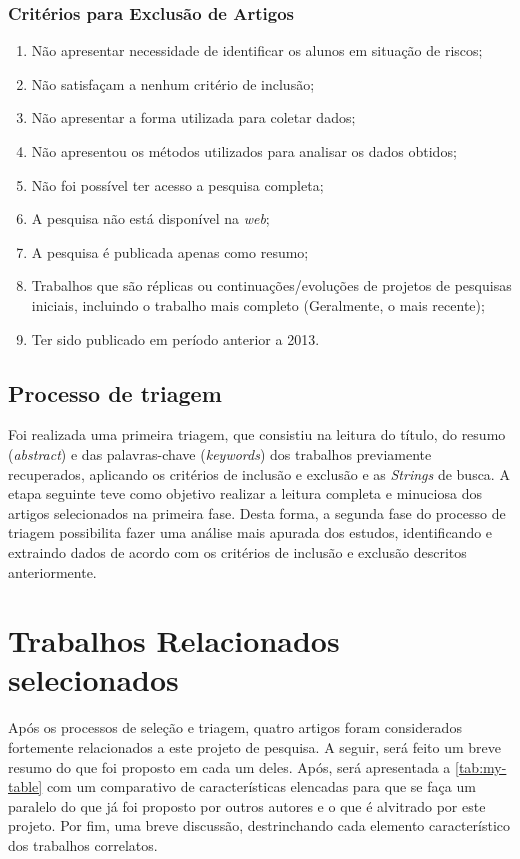 \documentclass[
	12pt,				%
	openright,			%
	oneside,
	a4paper,			%
	english,			%
	french,				%
	spanish,			%
	brazil,				%
	]{abntex2}
\begin{document}
\subsubsection{Critérios para Exclusão de Artigos}
\begin{enumerate}
    \item Não apresentar necessidade de identificar os alunos em situação de riscos;
    \item Não satisfaçam a nenhum critério de inclusão;
    \item Não apresentar a forma utilizada para coletar dados;
    \item Não apresentou os métodos utilizados para analisar os dados obtidos;
    \item Não foi possível ter acesso a pesquisa completa;
    \item A pesquisa não está disponível na \textit{web};
    \item A pesquisa é publicada apenas como resumo;
    \item Trabalhos que são réplicas ou continuações/evoluções de projetos de pesquisas iniciais, incluindo o trabalho mais completo (Geralmente, o mais recente);
    \item Ter sido publicado em período anterior a 2013.
\end{enumerate}

\subsection{Processo de triagem}
Foi realizada uma primeira triagem, que consistiu na leitura do título, do resumo (\textit{abstract}) e das palavras-chave (\textit{keywords}) dos trabalhos previamente recuperados, aplicando os critérios de inclusão e exclusão e as \textit{Strings} de busca.
A etapa seguinte teve como objetivo realizar a leitura completa e minuciosa dos artigos selecionados na primeira fase. Desta forma, a segunda fase do processo de triagem possibilita fazer uma análise mais apurada dos estudos, identificando e extraindo dados de acordo com os critérios de inclusão e exclusão descritos anteriormente.

\section{Trabalhos Relacionados selecionados}
Após os processos de seleção e triagem, quatro artigos foram considerados fortemente relacionados a este projeto de pesquisa. A seguir, será feito um breve resumo do que foi proposto em cada um deles. Após, será apresentada a \autoref{tab:my-table} com um comparativo de características elencadas para que se faça um paralelo do que já foi proposto por outros autores e o que é alvitrado por este projeto. Por fim, uma breve discussão, destrinchando cada elemento característico dos trabalhos correlatos.
\end{document}
